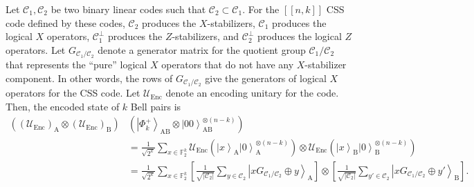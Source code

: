 \documentclass[journal,onecolumn]{IEEEtran}
\newcommand{\dket}[1]{\left\lvert #1 \right\rangle}
\newcommand{\MCC}{\mathcal{C}}
\newcommand{\llbr}{[\![}
\newcommand{\rrbr}{]\!]}
\begin{document}
Let $\MCC_1, \MCC_2$ be two binary linear codes such that $\MCC_2 \subset \MCC_1$.
For the $\llbr n,k \rrbr$ CSS code defined by these codes, $\MCC_2$ produces the $X$-stabilizers, $\MCC_1$ produces the logical $X$ operators, $\MCC_1^{\perp}$ produces the $Z$-stabilizers, and $\MCC_2^{\perp}$ produces the logical $Z$ operators.
Let $G_{\MCC_1/\MCC_2}$ denote a generator matrix for the quotient group $\MCC_1/\MCC_2$ that represents the ``pure'' logical $X$ operators that do not have any $X$-stabilizer component.
In other words, the rows of $G_{\MCC_1/\MCC_2}$ give the generators of logical $X$ operators for the CSS code.
Let $\mathcal{U}_{\text{Enc}}$ denote an encoding unitary for the code.
Then, the encoded state of $k$ Bell pairs is~\cite{Calderbank-physreva96,Nielsen-2010}
\begin{align}
\left( (\mathcal{U}_{\text{Enc}})_{\text{A}} \otimes (\mathcal{U}_{\text{Enc}})_{\text{B}} \right) & \left( \dket{\Phi_k^+}_{\text{AB}} \otimes \dket{00}_{\text{AB}}^{\otimes (n-k)} \right) \nonumber \\
%
  & = \frac{1}{\sqrt{2^k}} \sum_{x \in \mathbb{F}_2^k} \mathcal{U}_{\text{Enc}} \left( \dket{x}_{\text{A}} \dket{0}_{\text{A}}^{\otimes (n-k)} \right) \otimes \mathcal{U}_{\text{Enc}} \left( \dket{x}_{\text{B}} \dket{0}_{\text{B}}^{\otimes (n-k)} \right) \\
%
\label{eq:encoded_bell_pairs}
  & = \frac{1}{\sqrt{2^k}} \sum_{x \in \mathbb{F}_2^k} \left[ \frac{1}{\sqrt{|\MCC_2|}} \sum_{y \in \MCC_2} \dket{xG_{\MCC_1/\MCC_2} \oplus y}_{\text{A}} \right] \otimes \left[ \frac{1}{\sqrt{|\MCC_2|}} \sum_{y' \in \MCC_2} \dket{xG_{\MCC_1/\MCC_2} \oplus y'}_{\text{B}} \right].
\end{align}
\end{document}
